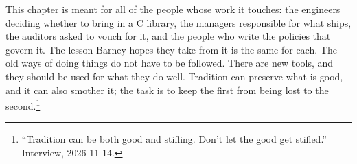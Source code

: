 This chapter is meant for all of the people whose work it touches: the engineers
deciding whether to bring in a C library, the managers responsible for what
ships, the auditors asked to vouch for it, and the people who write the policies
that govern it. The lesson Barney hopes they take from it is the same for each.
The old ways of doing things do not have to be followed. There are new tools,
and they should be used for what they do well. Tradition can preserve what is
good, and it can also smother it; the task is to keep the first from being lost
to the second.\footnote{``Tradition can be both good and stifling. Don't let the
good get stifled.'' Interview, 2026-11-14.}

